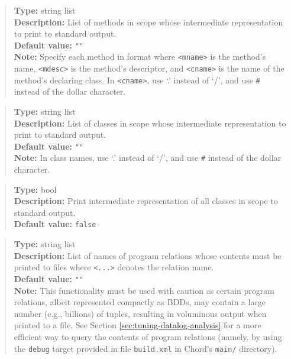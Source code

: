 \begin{quote}
{\bf Type:} string list  \\
{\bf Description:} List of methods in scope whose intermediate representation to print to standard output. \\
{\bf Default value:} {\tt ""} \\
{\bf Note:} Specify each method in format  where {\tt <mname>} is the method's name, {\tt <mdesc>} is the method's descriptor, and {\tt <cname>} is the name of the method's declaring class. In {\tt <cname>}, use `.' instead of `/', and use {\tt \#} instead of the dollar character. 
\end{quote}

\begin{quote}
{\bf Type:} string list  \\
{\bf Description:} List of classes in scope whose intermediate representation to print to standard output. \\
{\bf Default value:} {\tt ""} \\
{\bf Note:} In class names, use `.' instead of `/', and use {\tt \#} instead of the dollar character. 
\end{quote}

\begin{quote}
{\bf Type:} bool \\
{\bf Description:} Print intermediate representation of all classes in scope to standard output. \\
{\bf Default value:} {\tt false}
\end{quote}

\begin{quote}
{\bf Type:} string list  \\
{\bf Description:} List of names of program relations whose contents must be printed to files  where {\tt <...>} denotes the relation name. \\
{\bf Default value:} {\tt ""} \\
{\bf Note:} This functionality must be used with caution as certain program relations, albeit represented compactly as BDDs, may contain a large number (e.g., billions) of tuples, resulting in voluminous output when printed to a file.  See Section \ref{sec:tuning-datalog-analysis} for a more efficient way to query the contents of program relations (namely, by using the {\tt debug} target provided in file {\tt build.xml} in Chord's {\tt main/} directory). 
\end{quote}


